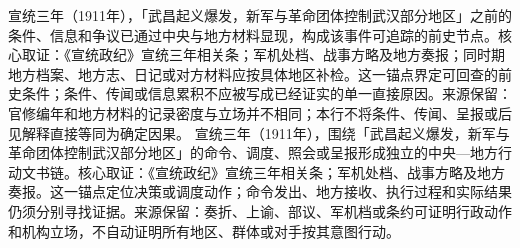 宣统三年（1911年），「武昌起义爆发，新军与革命团体控制武汉部分地区」之前的条件、信息和争议已通过中央与地方材料显现，构成该事件可追踪的前史节点。核心取证：《宣统政纪》宣统三年相关条；军机处档、战事方略及地方奏报；同时期地方档案、地方志、日记或对方材料应按具体地区补检。这一锚点界定可回查的前史条件；条件、传闻或信息累积不应被写成已经证实的单一直接原因。来源保留：官修编年和地方材料的记录密度与立场并不相同；本行不将条件、传闻、呈报或后见解释直接等同为确定因果。
宣统三年（1911年），围绕「武昌起义爆发，新军与革命团体控制武汉部分地区」的命令、调度、照会或呈报形成独立的中央—地方行动文书链。核心取证：《宣统政纪》宣统三年相关条；军机处档、战事方略及地方奏报。这一锚点定位决策或调度动作；命令发出、地方接收、执行过程和实际结果仍须分别寻找证据。来源保留：奏折、上谕、部议、军机档或条约可证明行政动作和机构立场，不自动证明所有地区、群体或对手按其意图行动。
